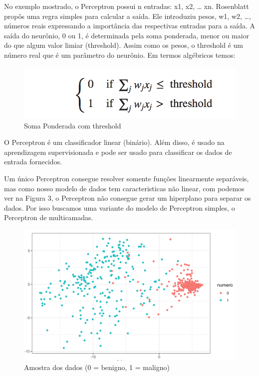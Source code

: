 \documentclass[conference]{IEEEtran}
\begin{document}
	No exemplo mostrado, o Perceptron possui n entradas: x1, x2, … xn. Rosenblatt propôs uma regra simples para calcular a saída. Ele introduziu pesos, w1, w2, …, números reais expressando a importância das respectivas entradas para a saída. A saída do neurônio, 0 ou 1, é determinada pela soma ponderada, menor ou maior do que algum valor limiar (threshold). Assim como os pesos, o threshold é um número real que é um parâmetro do neurônio. Em termos algébricos temos:
	
	\begin{figure}[htbp]
	\centerline{\includegraphics[scale=0.8]{Perceptron-threshold.png}}
	\caption{Soma Ponderada com threshold}
	\label{fig}
	\end{figure}

    O Perceptron é um classificador linear (binário). Além disso, é usado na aprendizagem supervisionada e pode ser usado para classificar os dados de entrada fornecidos.
    
    Um único Perceptron consegue resolver somente funções linearmente separáveis,  mas como nosso modelo de dados tem caracteristicas não linear, com podemos ver na Figura 3, o Perceptron não consegue gerar um hiperplano para separar os dados. Por isso buscamos uma variante do modelo de Perceptron simples, o Perceptron de multicamadas.
    
    \begin{figure}[htbp]
	\centerline{\includegraphics[scale=0.3]{dados-cancer.png}}
	\caption{Amostra dos dados (0 = benigno, 1 = maligno)}
	\label{fig}
	\end{figure}
    
\end{document}
